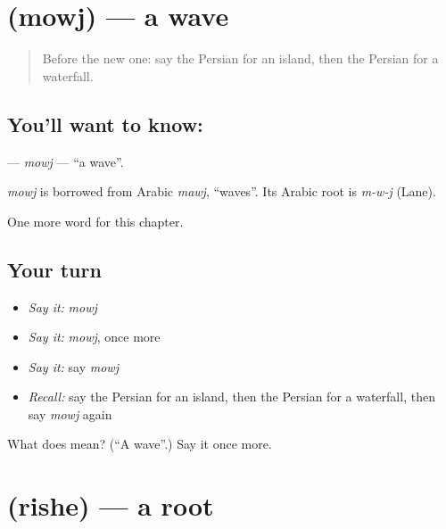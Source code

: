 \section[\texorpdfstring{\fa{موج} (mowj)}{موج (mowj)}]{ (mowj) — a wave}

\label{lesson:FA-C103-mowj}



\begin{quote}
Before the new one: say the Persian for an island, then the Persian for a waterfall.
\end{quote}

\subsection*{You'll want to know: }
\textbf{} — \emph{mowj} — \textquotedblleft{}a wave\textquotedblright{}.

\begin{cousinweb}
\emph{mowj} is borrowed from Arabic \emph{mawj}, \textquotedblleft{}waves\textquotedblright{}. Its Arabic root is \emph{m-w-j} (Lane).
\end{cousinweb}

\begin{grammarlens}[title={What you've built}]
One more word for this chapter.
\end{grammarlens}

\subsection*{Your turn}
\begin{itemize}
\raggedright
  \item \emph{Say it:} \emph{mowj}
  \item \emph{Say it:} \emph{mowj}, once more
  \item \emph{Say it:} say \emph{mowj}
  \item \emph{Recall:} say the Persian for an island, then the Persian for a waterfall, then say \emph{mowj} again
\end{itemize}

\begin{tcolorbox}[breakable,colback=teal!4,colframe=teal!35!black,title={Before you move on}]
What does  mean? (\textquotedblleft{}A wave\textquotedblright{}.) Say it once more.
\end{tcolorbox}
\section[\texorpdfstring{\fa{ریشه} (rishe)}{ریشه (rishe)}]{ (rishe) — a root}

